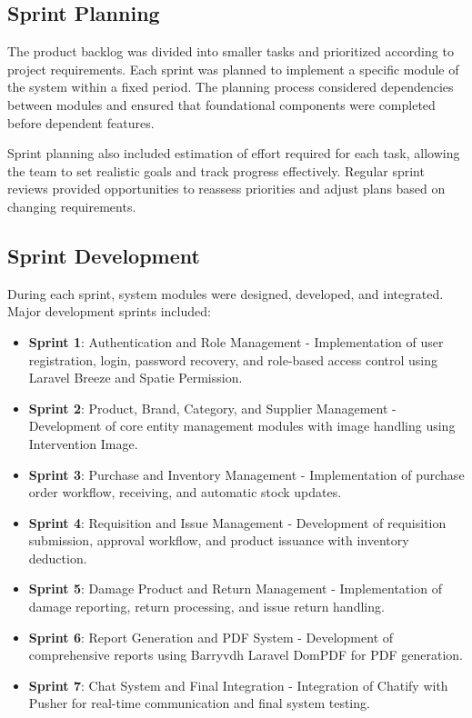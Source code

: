 \subsection{Sprint Planning}

The product backlog was divided into smaller tasks and prioritized according to project requirements. Each sprint was planned to implement a specific module of the system within a fixed period. The planning process considered dependencies between modules and ensured that foundational components were completed before dependent features.

Sprint planning also included estimation of effort required for each task, allowing the team to set realistic goals and track progress effectively. Regular sprint reviews provided opportunities to reassess priorities and adjust plans based on changing requirements.

\subsection{Sprint Development}

During each sprint, system modules were designed, developed, and integrated. Major development sprints included:

\begin{itemize}
    \item \textbf{Sprint 1}: Authentication and Role Management - Implementation of user registration, login, password recovery, and role-based access control using Laravel Breeze and Spatie Permission.

    \item \textbf{Sprint 2}: Product, Brand, Category, and Supplier Management - Development of core entity management modules with image handling using Intervention Image.

    \item \textbf{Sprint 3}: Purchase and Inventory Management - Implementation of purchase order workflow, receiving, and automatic stock updates.

    \item \textbf{Sprint 4}: Requisition and Issue Management - Development of requisition submission, approval workflow, and product issuance with inventory deduction.

    \item \textbf{Sprint 5}: Damage Product and Return Management - Implementation of damage reporting, return processing, and issue return handling.

    \item \textbf{Sprint 6}: Report Generation and PDF System - Development of comprehensive reports using Barryvdh Laravel DomPDF for PDF generation.

    \item \textbf{Sprint 7}: Chat System and Final Integration - Integration of Chatify with Pusher for real-time communication and final system testing.
\end{itemize}

